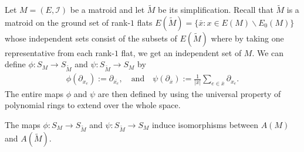 \documentclass{puthesis-UG}
\begin{document}
Let $M = (E, \mathcal{I})$ be a matroid and let $\widetilde{M}$ be its simplification. Recall that $\widetilde{M}$ is a matroid on the ground set of rank-$1$ flats $E(\widetilde{M}) = \{\bar{x} : x \in E(M) \backslash E_0 (M)\}$ whose independent sets consist of the subsets of $E(\widetilde{M})$ where by taking one representative from each rank-$1$ flat, we get an independent set of $M$. We can define $\phi : S_M \to S_{\widetilde{M}}$ and $\psi : S_{\widetilde{M}} \to S_M$ by 
\begin{align*}
	\phi (\partial_{x_e}) := \partial_{\overline{x_e}}, \quad \text{and} \quad \psi (\partial_{\overline{x}}) := \frac{1}{|\overline{x}|} \sum_{e \in \overline{x}} \partial_{x_e}.
\end{align*}
The entire maps $\phi$ and $\psi$ are then defined by using the universal property of polynomial rings to extend over the whole space. 

\begin{thm} \label{only-simplification-matters}
	The maps $\phi : S_M \to S_{\widetilde{M}}$ and $\psi : S_{\widetilde{M}} \to S_M$ induce isomorphisms between $A(M)$ and $A(\widetilde{M})$. 
\end{thm}
\end{document}
